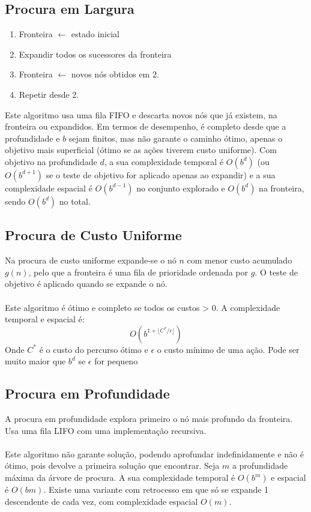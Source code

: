 \documentclass[10pt,a4paper]{report}
\begin{document}
\subsection{Procura em Largura}
\begin{enumerate}
\item Fronteira $\leftarrow$ estado inicial
\item Expandir todos os sucessores da fronteira
\item Fronteira $\leftarrow$ novos nós obtidos em 2.
\item Repetir desde 2.
\end{enumerate}
Este algoritmo usa uma fila FIFO e descarta novos nós que já existem, na fronteira ou expandidos. Em termos de desempenho, é completo desde que a profundidade e $b$ sejam finitos, mas não garante o caminho ótimo, apenas o objetivo mais superficial (ótimo se as ações tiverem custo uniforme). Com objetivo na profundidade $d$, a sua complexidade temporal é $O(b^d)$ (ou $O(b^{d+1})$ se o teste de objetivo for aplicado apenas ao expandir) e a sua complexidade espacial é $O(b^{d-1})$ no conjunto explorado e $O(b^d)$ na fronteira, sendo $O(b^d)$ no total.
\subsection{Procura de Custo Uniforme}
Na procura de custo uniforme expande-se o nó $n$ com menor custo acumulado $g(n)$, pelo que a fronteira é uma fila de prioridade ordenada por $g$. O teste de objetivo é aplicado quando se expande o nó.\\
\\
Este algoritmo é ótimo e completo se todos os custos > 0. A complexidade temporal e espacial é:
$$
O(b^{1+\lfloor C^*/\epsilon\rfloor})
$$
Onde $C^*$ é o custo do percurso ótimo e $\epsilon$ o custo mínimo de uma ação. Pode ser muito maior que $b^d$ se $\epsilon$ for pequeno
\subsection{Procura em Profundidade}
A procura em profundidade explora primeiro o nó mais profundo da fronteira. Usa uma fila LIFO com uma implementação recursiva. \\
\\
Este algoritmo não garante solução, podendo aprofundar indefinidamente e não é ótimo, pois devolve a primeira solução que encontrar. Seja $m$ a profundidade máxima da árvore de procura. A sua complexidade temporal é $O(b^m)$ e espacial é $O(bm)$. Existe uma variante com retrocesso em que só se expande 1 descendente de cada vez, com complexidade espacial $O(m)$.
\end{document}
